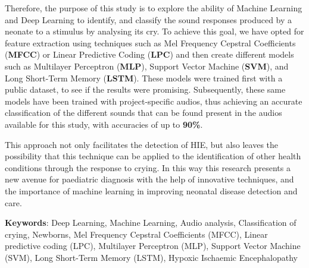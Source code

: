 Therefore, the purpose of this study is to explore the ability of Machine Learning and Deep Learning to identify, and classify the sound responses produced by a neonate to a stimulus by analysing its cry. To achieve this goal, we have opted for feature extraction using techniques such as Mel Frequency Cepstral Coeﬃcients (\textbf{MFCC}) or Linear Predictive Coding (\textbf{LPC}) and then create different models such as Multilayer Perceptron (\textbf{MLP}), Support Vector Machine (\textbf{SVM}), and Long Short-Term Memory (\textbf{LSTM}). These models were trained first with a public dataset, to see if the results were promising. Subsequently, these same models have been trained with project-specific audios, thus achieving an accurate classification of the different sounds that can be found present in the audios available for this study, with accuracies of up to \textbf{90\%}. 

This approach not only facilitates the detection of HIE, but also leaves the possibility that this technique can be applied to the identification of other health conditions through the response to crying. In this way this research presents a new avenue for paediatric diagnosis with the help of innovative techniques, and the importance of machine learning in improving neonatal disease detection and care.

\vspace{\baselineskip}
\textbf{Keywords}: Deep Learning, Machine Learning, Audio analysis, Classification of crying, Newborns, Mel Frequency Cepstral Coeﬃcients (MFCC), Linear predictive coding (LPC), Multilayer Perceptron (MLP), Support Vector Machine (SVM), Long Short-Term Memory (LSTM), Hypoxic Ischaemic Encephalopathy



